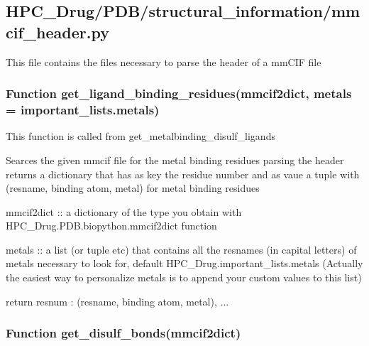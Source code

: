 

\subsection{HPC\_Drug/PDB/structural\_information/mmcif\_header.py}

    This file contains the files necessary to parse the header of a mmCIF file

    \subsubsection{Function get\_ligand\_binding\_residues(mmcif2dict, metals = important\_lists.metals)}

        This function is called from get\_metalbinding\_disulf\_ligands

        Searces the given mmcif file for the metal binding residues parsing the header returns a dictionary that has as key the residue number and as vaue a tuple with (resname, binding atom, metal) for metal binding residues

        mmcif2dict :: a dictionary of the type you obtain with HPC\_Drug.PDB.biopython.mmcif2dict function

        metals :: a list (or tuple etc) that contains all the resnames (in capital letters) of metals necessary to look for, default HPC\_Drug.important\_lists.metals (Actually the easiest way to personalize metals is to append your custom values to this list)

        return {resnum : (resname, binding atom, metal), ...}

    \subsubsection{Function get\_disulf\_bonds(mmcif2dict)}
    
